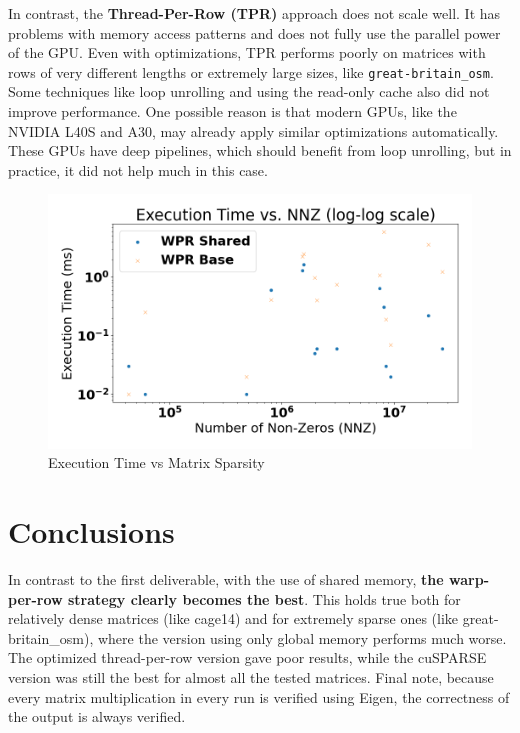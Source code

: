 \documentclass[conference]{IEEEtran}
\begin{document}
\newpage
In contrast, the \textbf{Thread-Per-Row (TPR)} approach does not scale well. It has problems with memory access patterns and does not fully use the parallel power of the GPU. Even with optimizations, TPR performs poorly on matrices with rows of very different lengths or extremely large sizes, like \texttt{great-britain\_osm}. Some techniques like loop unrolling and using the read-only cache also did not improve performance. One possible reason is that modern GPUs, like the NVIDIA L40S and A30, may already apply similar optimizations automatically. These GPUs have deep pipelines, which should benefit from loop unrolling, but in practice, it did not help much in this case.



\begin{figure}[ht]
    \centering
    \includegraphics[width=0.95\linewidth]{exectimeVsSparsity.png}
    \caption{Execution Time vs Matrix Sparsity}
    \label{fig:spvmexample}
\end{figure}



\section{Conclusions}

In contrast to the first deliverable, with the use of shared memory, \textbf{the warp-per-row strategy clearly becomes the best}. This holds true both for relatively dense matrices (like cage14) and for extremely sparse ones (like great-britain\_osm), where the version using only global memory performs much worse. The optimized thread-per-row version gave poor results, while the cuSPARSE version was still the best for almost all the tested matrices. Final note, because every matrix multiplication in every run is verified using Eigen, the correctness of the output is always verified.



\end{document}
